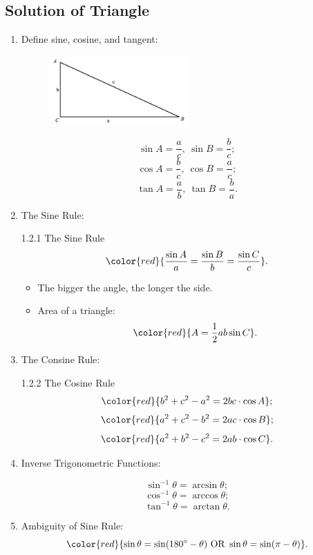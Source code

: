 \documentclass[12pt, a4paper]{article}
\begin{document}
\subsection{Solution of Triangle}
\begin{enumerate}
  \item Define sine, cosine, and tangent: 
  \begin{myclaim}{ }{}
    \begin{figure}[H]
      \centering
      \includegraphics[width=0.5\textwidth]{Fig.19.jpg}
    \end{figure}
    $$\sin A=\frac{a}{c},\ \sin B=\frac{b}{c};$$
    $$\cos A=\frac{b}{c},\ \cos B=\frac{a}{c};$$
    $$\tan A=\frac{a}{b},\ \tan B=\frac{b}{a}.$$
  \end{myclaim}
  \item The Sine Rule: 
  \begin{theorem}{1.2.1 The Sine Rule}{}
    $${\color{red}{\frac{\sin A}{a}=\frac{\sin B}{b}=\frac{\sin C}{c}}}.$$
  \end{theorem}
  \begin{itemize}
    \item The bigger the angle, the longer the side. 
    \item Area of a triangle: $${\color{red}{A=\frac{1}{2}ab\sin C}}.$$
  \end{itemize}
  \item The Consine Rule: 
  \begin{theorem}{1.2.2 The Cosine Rule}{}
    $${\color{red}{b^2+c^2-a^2=2bc\cdot\cos A}};$$
    $${\color{red}{a^2+c^2-b^2=2ac\cdot\cos B}};$$
    $${\color{red}{a^2+b^2-c^2=2ab\cdot\cos C}}.$$
  \end{theorem}
  \item Inverse Trigonometric Functions: 
  \begin{myclaim}{ }{}
    $$\sin^{-1}\theta=\arcsin\theta;$$
    $$\cos^{-1}\theta=\arccos\theta;$$
    $$\tan^{-1}\theta=\arctan\theta.$$
  \end{myclaim}
  \item Ambiguity of Sine Rule: 
  $${\color{red}{\sin\theta=\sin(180^\circ-\theta)\text{ OR }\sin\theta=\sin(\pi-\theta)}}.$$

\end{enumerate}
\end{document}
